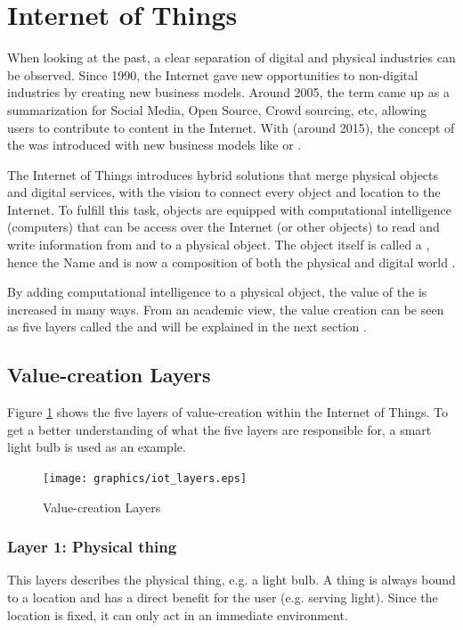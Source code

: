 \section{Internet of Things}

When looking at the past, a clear separation of digital and physical industries can be observed. Since 1990, the Internet gave new opportunities to non-digital industries by creating new business models. Around 2005, the term  came up as a summarization for Social Media, Open Source, Crowd sourcing, etc, allowing users to contribute to content in the Internet. With  (around 2015), the concept of the  was introduced with new business models like  or \cite{iotfleisch}.

The Internet of Things introduces hybrid solutions that merge physical objects and digital services, with the vision to connect every object and location to the Internet. To fulfill this task, objects are equipped with computational intelligence (computers) that can be access over the Internet (or other objects) to read and write information from and to a physical object. The object itself is called a , hence the Name  and is now a composition of both the physical and digital world \cite{iotfleisch}.

By adding computational intelligence to a physical object, the value of the  is increased in many ways. From an academic view, the value creation can be seen as five layers called the  and will be explained in the next section \cite{iotfleisch}.

\subsection{Value-creation Layers}

Figure \ref{fig:value_creation_layers} shows the five layers of value-creation within the Internet of Things. To get a better understanding of what the five layers are responsible for, a smart light bulb is used as an example.

\begin{figure}[h]
	\centering
		\texttt{[image: graphics/iot\_layers.eps]}
	\caption{Value-creation Layers\cite{iotfleisch}}
	\label{fig:value_creation_layers}
\end{figure}

\subsubsection{Layer 1: Physical thing}
This layers describes the physical thing, e.g. a light bulb. A thing is always bound to a location and has a direct benefit for the user (e.g. serving light). Since the location is fixed, it can only act in an immediate environment.

